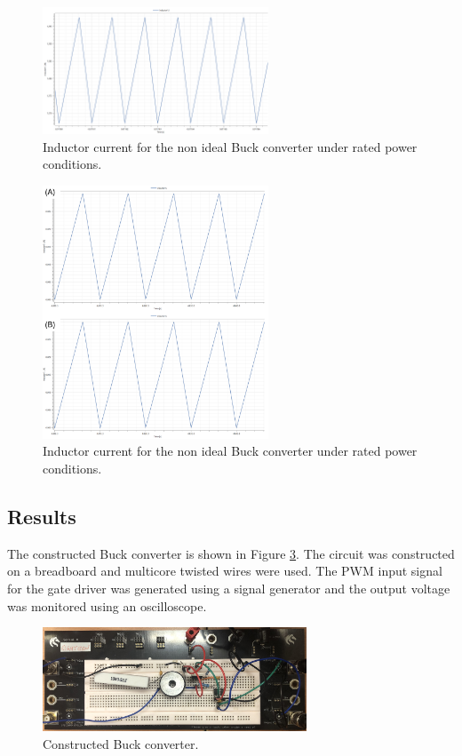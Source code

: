 \documentclass[12pt,twoside]{scrartcl}
\begin{document}
\begin{figure}[htp]
    \centering
    \includegraphics[width=0.6\textwidth]{buck_Current.png}
    \caption{Inductor current for the non ideal Buck converter under rated power conditions.}
    \label{fig:buck_Current}
\end{figure}

\begin{figure}[htp]
    \centering
    \includegraphics[width=0.6\textwidth]{buck_NIDCM}
    \caption{Inductor current for the non ideal Buck converter under rated power conditions.}
    \label{fig:buck_NIDCM}
\end{figure}

\subsection{Results}
The constructed Buck converter is shown in Figure \ref{fig:buck_real}. The circuit was constructed on a breadboard and multicore twisted wires were used. The PWM input signal for the gate driver was generated using a signal generator and the output voltage was monitored using an oscilloscope. \par

\begin{figure}[htp]
    \centering
    \includegraphics[width=0.7\textwidth]{buck_real}
    \caption{Constructed Buck converter.}
    \label{fig:buck_real}
\end{figure}
\end{document}

